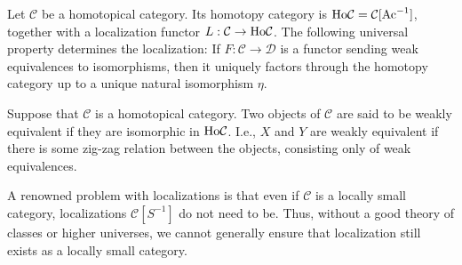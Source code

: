 \documentclass[../thesis.tex]{subfiles}
\begin{document}
            \begin{definition}
                Let $\mathcal{C}$ be a homotopical category. Its homotopy category is $\tt{Ho}\mathcal{C} = \mathcal{C}[\tt{Ac}^{-1}]$, together with a localization functor $L:\mathcal{C}\rightarrow \tt{Ho}\mathcal{C}$. The following universal property determines the localization: If $F:\mathcal{C}\rightarrow \mathcal{D}$ is a functor sending weak equivalences to isomorphisms, then it uniquely factors through the homotopy category up to a unique natural isomorphism $\eta$.

                \begin{center}
                \end{center}
            \end{definition}

            \begin{definition}
                Suppose that $\mathcal{C}$ is a homotopical category. Two objects of $\mathcal{C}$ are said to be weakly equivalent if they are isomorphic in $\tt{Ho}\mathcal{C}$. I.e., $X$ and $Y$ are weakly equivalent if there is some zig-zag relation between the objects, consisting only of weak equivalences.
                \begin{center}
                \end{center}
            \end{definition}

            \begin{remark}
                A renowned problem with localizations is that even if $\mathcal{C}$ is a locally small category, localizations $\mathcal{C}[S^{-1}]$ do not need to be. Thus, without a good theory of classes or higher universes, we cannot generally ensure that localization still exists as a locally small category.
            \end{remark}
\end{document}
